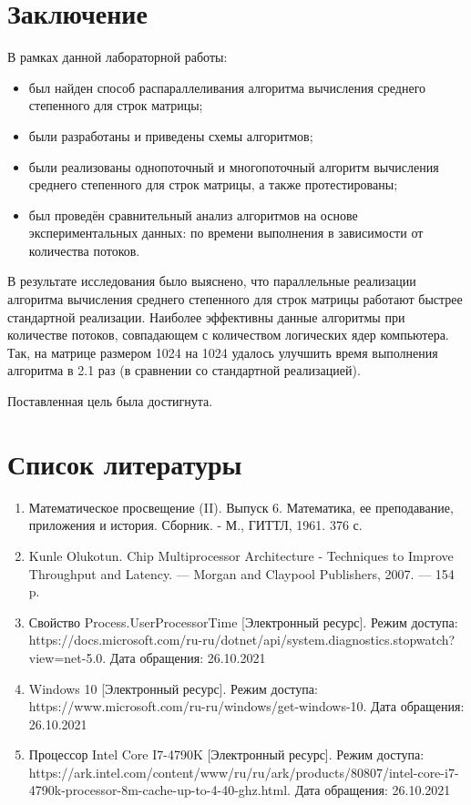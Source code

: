\documentclass[12pt]{report}
\begin{document}
\chapter*{Заключение}

В рамках данной лабораторной работы:

\begin{itemize}
	\item был найден способ распараллеливания алгоритма вычисления среднего степенного для строк матрицы;
	\item были разработаны и приведены схемы алгоритмов;
	\item были реализованы однопоточный и многопоточный алгоритм вычисления среднего степенного для строк матрицы, а также протестированы;
	\item был проведён сравнительный анализ алгоритмов на основе экспериментальных данных: по времени выполнения в зависимости от количества потоков.
\end{itemize}

В результате исследования было выяснено, что параллельные реализации алгоритма вычисления среднего степенного для строк матрицы работают быстрее стандартной реализации. Наиболее эффективны данные алгоритмы при количестве потоков, совпадающем с количеством логических ядер компьютера. Так, на матрице размером 1024 на 1024 удалось улучшить время выполнения алгоритма в 2.1 раз (в сравнении со стандартной реализацией).

Поставленная цель была достигнута.

\chapter*{Список литературы}
\begin{enumerate}
	\item Математическое просвещение (II). Выпуск 6. Математика, ее преподавание, приложения и история. Сборник. - М., ГИТТЛ, 1961. 376 с.
	\item Kunle Olukotun. Chip Multiprocessor Architecture - Techniques to Improve Throughput and Latency. — Morgan and Claypool Publishers, 2007. — 154 p.
	\item Свойство Process.UserProcessorTime [Электронный ресурс]. Режим доступа: https://docs.microsoft.com/ru-ru/dotnet/api/system.diagnostics.stopwatch?view=net-5.0. Дата обращения: 26.10.2021
	\item Windows 10 [Электронный ресурс]. Режим доступа: https://www.microsoft.com/ru-ru/windows/get-windows-10. Дата обращения: 26.10.2021
	\item Процессор Intel Core I7-4790K [Электронный ресурс]. Режим доступа: https://ark.intel.com/content/www/ru/ru/ark/products/80807/intel-core-i7-4790k-processor-8m-cache-up-to-4-40-ghz.html. Дата обращения: 26.10.2021
\end{enumerate}
\end{document}
